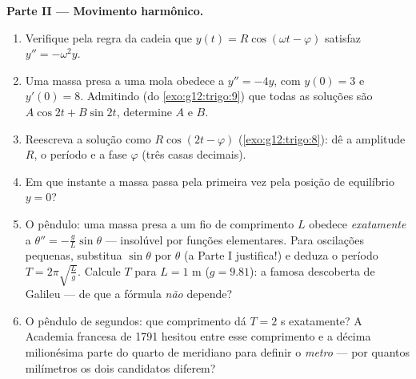 \begin{problem}
\medskip
\noindent\textbf{Parte II --- Movimento harmônico.}
\begin{enumerate}[resume]
  \item Verifique pela regra da cadeia que
        $y(t) = R\cos(\omega t - \varphi)$ satisfaz
        $y'' = -\omega^2 y$.
  \item Uma massa presa a uma mola obedece a $y'' = -4y$, com
        $y(0) = 3$ e $y'(0) = 8$. Admitindo (do
        \cref{exo:g12:trigo:9}) que todas as soluções são
        $A\cos 2t + B\sin 2t$, determine $A$ e $B$.
  \item Reescreva a solução como $R\cos(2t - \varphi)$
        (\cref{exo:g12:trigo:8}): dê a amplitude $R$, o período e
        a fase $\varphi$ (três casas decimais).
  \item Em que instante a massa passa pela primeira vez pela
        posição de equilíbrio $y = 0$?
  \item O pêndulo: uma massa presa a um fio de comprimento $L$
        obedece \emph{exatamente} a
        $\theta'' = -\frac gL \sin\theta$ --- insolúvel por
        funções elementares. Para oscilações pequenas, substitua
        $\sin\theta$ por $\theta$ (a Parte I justifica!) e deduza
        o período $T = 2\pi\sqrt{\frac Lg}$. Calcule $T$ para
        $L = 1$ m ($g = 9.81$): a famosa descoberta de Galileu
        --- de que a fórmula \emph{não} depende?
  \item O pêndulo de segundos: que comprimento dá $T = 2$ s
        exatamente? A Academia francesa de 1791 hesitou entre
        esse comprimento e a décima milionésima parte do quarto
        de meridiano para definir o \emph{metro} --- por quantos
        milímetros os dois candidatos diferem?
\end{enumerate}


\end{problem}
